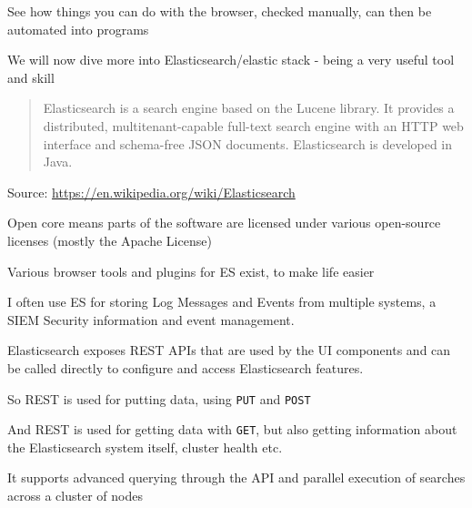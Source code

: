 \documentclass[Screen16to9,17pt]{foils}
\begin{document}
See how things you can do with the browser, checked manually, can then be automated into programs




We will now dive more into Elasticsearch/elastic stack - being a very useful tool and skill

\begin{quote}
Elasticsearch is a search engine based on the Lucene library. It provides a distributed, multitenant-capable full-text search engine with an HTTP web interface and schema-free JSON documents. Elasticsearch is developed in Java.
\end{quote}

Source: \url{https://en.wikipedia.org/wiki/Elasticsearch}

\begin{list2}
\item Open core means parts of the software are licensed under various open-source licenses (mostly the Apache License)
\item Various browser tools and plugins for ES exist, to make life easier
\item I often use ES for storing Log Messages and Events from multiple systems, a SIEM Security information and event management.
\end{list2}




\begin{quote}

\end{quote}

\begin{list2}
\item Elasticsearch exposes REST APIs that are used by the UI components and can be called directly to configure and access Elasticsearch features.
\item {}
\item So REST is used for putting data, using \verb+PUT+ and \verb+POST+
\item And REST is used for getting data with \verb+GET+, but also getting information about the Elasticsearch system itself, cluster health etc.
\item It supports advanced querying through the API and parallel execution of searches across a cluster of nodes
\end{list2}




\slidenext
\end{document}
